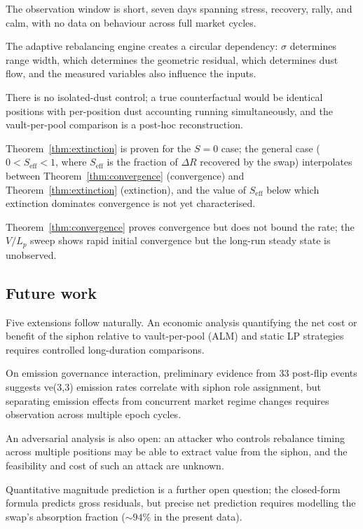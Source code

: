 \documentclass[11pt,a4paper]{article}
\begin{document}
The observation window is short, seven days spanning stress, recovery, rally, and calm, with no data on behaviour across full market cycles.

The adaptive rebalancing engine creates a circular dependency: $\sigma$ determines range width, which determines the geometric residual, which determines dust flow, and the measured variables also influence the inputs.

There is no isolated-dust control; a true counterfactual would be identical positions with per-position dust accounting running simultaneously, and the vault-per-pool comparison is a post-hoc reconstruction.

Theorem~\ref{thm:extinction} is proven for the $S = 0$ case; the general case ($0 < S_{\text{eff}} < 1$, where $S_{\text{eff}}$ is the fraction of $\Delta R$ recovered by the swap) interpolates between Theorem~\ref{thm:convergence} (convergence) and Theorem~\ref{thm:extinction} (extinction), and the value of $S_{\text{eff}}$ below which extinction dominates convergence is not yet characterised.

Theorem~\ref{thm:convergence} proves convergence but does not bound the rate; the $V/L_p$ sweep shows rapid initial convergence but the long-run steady state is unobserved.

\subsection{Future work}\label{sec:future}

Five extensions follow naturally. An economic analysis quantifying the net cost or benefit of the siphon relative to vault-per-pool (ALM) and static LP strategies requires controlled long-duration comparisons.

On emission governance interaction, preliminary evidence from 33 post-flip events suggests ve(3,3) emission rates correlate with siphon role assignment, but separating emission effects from concurrent market regime changes requires observation across multiple epoch cycles.

An adversarial analysis is also open: an attacker who controls rebalance timing across multiple positions may be able to extract value from the siphon, and the feasibility and cost of such an attack are unknown.

Quantitative magnitude prediction is a further open question; the closed-form formula predicts gross residuals, but precise net prediction requires modelling the swap's absorption fraction (${\sim}94\%$ in the present data).
\end{document}
